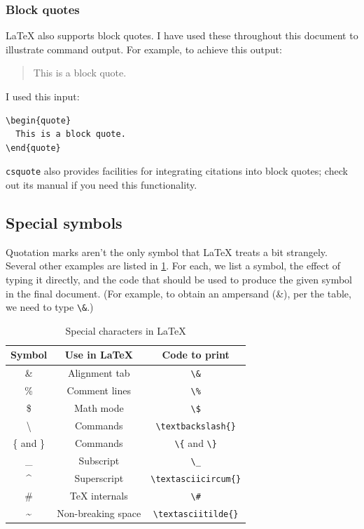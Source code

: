 \documentclass{article}
\newcommand*{\code}[1]{\texttt{#1}}
\begin{document}
\subsubsection{Block quotes}
\label{s:blockquotes}
\LaTeX{} also supports block quotes.
I have used these throughout this document to illustrate command output.
For example, to achieve this output:
\begin{quote}
  This is a block quote.
\end{quote}
I used this input:
\begin{verbatim}
\begin{quote}
  This is a block quote.
\end{quote}
\end{verbatim}

\code{csquote} also provides facilities for integrating citations into block quotes; check out its manual if you need this functionality.

\subsection{Special symbols}
\label{s:symbols}
Quotation marks aren't the only symbol that \LaTeX{} treats a bit strangely.
Several other examples are listed in \cref{tab:controlchars}.
For each, we list a symbol, the effect of typing it directly, and the code that should be used to produce the given symbol in the final document.
(For example, to obtain an ampersand (\&), per the table, we need to type \code{\textbackslash{}\&}.)

\begin{table}[htb]
  \centering{}
  \begin{tabular}{c c c}
    \toprule
    Symbol & Use in \LaTeX{} & Code to print \\ \midrule
    \& & Alignment tab & \code{\textbackslash{}\&} \\
    \% & Comment lines & \code{\textbackslash{}\%} \\
    \$ & Math mode & \code{\textbackslash{}\$} \\
    \textbackslash{} & Commands & \code{\textbackslash{}textbackslash\{\}} \\
    \{ and \} & Commands & \code{\textbackslash{}\{} and \code{\textbackslash{}\}} \\
    \_ & Subscript & \code{\textbackslash{}\_} \\
    \textasciicircum{} & Superscript & \code{\textbackslash{}textasciicircum\{\}} \\
    \# & \TeX{} internals & \code{\textbackslash{}\#} \\
    \textasciitilde{} & Non-breaking space & \code{\textbackslash{}textasciitilde\{\}} \\
    \bottomrule
  \end{tabular}
  \caption{Special characters in \LaTeX{}}
  \label{tab:controlchars}
\end{table}
\end{document}
